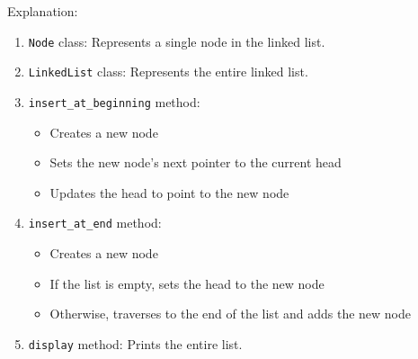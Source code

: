 \begin{Shaded}
\begin{Highlighting}[]
\OperatorTok{=}

\NormalTok{)}
\NormalTok{)}
\NormalTok{)}

\NormalTok{(}\NormalTok{)}

\NormalTok{)}
\NormalTok{)}

\NormalTok{(}\NormalTok{)}
\end{Highlighting}
\end{Shaded}

Explanation:

\begin{enumerate}
\def\labelenumi{\arabic{enumi}.}
\item
  \texttt{Node} class: Represents a single node in the linked list.
\item
  \texttt{LinkedList} class: Represents the entire linked list.
\item
  \texttt{insert\_at\_beginning} method:

  \begin{itemize}
  \tightlist
  \item
    Creates a new node
  \item
    Sets the new node's next pointer to the current head
  \item
    Updates the head to point to the new node
  \end{itemize}
\item
  \texttt{insert\_at\_end} method:

  \begin{itemize}
  \tightlist
  \item
    Creates a new node
  \item
    If the list is empty, sets the head to the new node
  \item
    Otherwise, traverses to the end of the list and adds the new node
  \end{itemize}
\item
  \texttt{display} method: Prints the entire list.
\end{enumerate}

